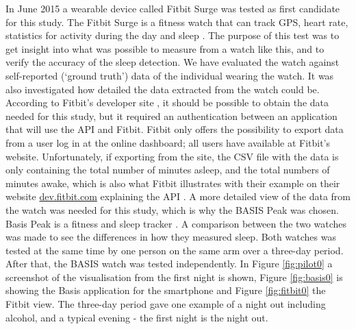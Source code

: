 \documentclass[12pt]{article} %
\begin{document}
In June 2015 a wearable device called Fitbit Surge was tested as first candidate for this study. The Fitbit Surge is a fitness watch that can track GPS, heart rate, statistics for activity during the day and sleep \cite{fitbit}. The purpose of this test was to get insight into what was possible to measure from a watch like this, and to verify the accuracy of the sleep detection. We have evaluated the watch against self-reported (`ground truth') data of the individual wearing the watch. It was also investigated how detailed the data extracted from the watch could be.  \\

According to Fitbit's developer site \cite{fitbit_dev}, it should be possible to obtain the data needed for this study, but it required an authentication between an application that will use the API and Fitbit. Fitbit only offers the possibility to export data from a user log in at the online dashboard; all users have available at Fitbit's website. Unfortunately, if exporting from the site, the CSV file with the data is only containing the total number of minutes asleep, and the total numbers of minutes awake, which is also what Fitbit illustrates with their example on their website \url{dev.fitbit.com} explaining the API \cite{fitbit_dev}. A more detailed view of the data from the watch was needed for this study, which is why the BASIS Peak was chosen.\\

Basis Peak is a fitness and sleep tracker \cite{basis}. A comparison between the two watches was made to see the differences in how they measured sleep. Both watches was tested at the same time by one person on the same arm over a three-day period. After that, the BASIS watch was tested independently. In Figure \ref{fig:pilot0} a screenshot of the visualisation from the first night is shown, Figure \ref{fig:basis0} is showing the Basis application for the smartphone and Figure \ref{fig:fitbit0} the Fitbit view. The three-day period gave one example of a night out including alcohol, and a typical evening - the first night is the night out. 
\end{document}
